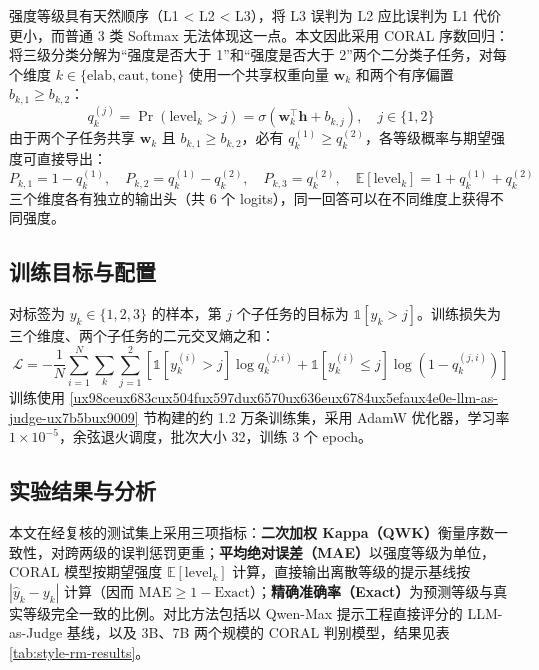 \documentclass[fontset=fandol,type=master,campus=shenzhen,etitleauto=true]{hithesisbook}
\begin{document}
强度等级具有天然顺序（L1 < L2 < L3），将 L3 误判为 L2 应比误判为 L1 代价更小，而普通 3 类 Softmax 无法体现这一点。本文因此采用 CORAL 序数回归\cite{ref86}：将三级分类分解为“强度是否大于 1”和“强度是否大于 2”两个二分类子任务，对每个维度 $k \in \{\text{elab}, \text{caut}, \text{tone}\}$ 使用一个共享权重向量 $\mathbf{w}_k$ 和两个有序偏置 $b_{k,1} \ge b_{k,2}$：
\begin{equation}
q_k^{(j)} = \Pr(\text{level}_k > j) = \sigma\!\left(\mathbf{w}_k^{\top}\mathbf{h} + b_{k,j}\right), \quad j \in \{1, 2\}
\end{equation}
由于两个子任务共享 $\mathbf{w}_k$ 且 $b_{k,1} \ge b_{k,2}$，必有 $q_k^{(1)} \ge q_k^{(2)}$，各等级概率与期望强度可直接导出：
\begin{equation}
P_{k,1} = 1 - q_k^{(1)}, \quad P_{k,2} = q_k^{(1)} - q_k^{(2)}, \quad P_{k,3} = q_k^{(2)}, \quad \mathbb{E}[\text{level}_k] = 1 + q_k^{(1)} + q_k^{(2)}
\end{equation}
三个维度各有独立的输出头（共 6 个 logits），同一回答可以在不同维度上获得不同强度。

\subsection{训练目标与配置}\label{ux8badux7ec3ux76eeux6807ux4e0eux4f18ux5316ux914dux7f6e-1}

对标签为 $y_k \in \{1,2,3\}$ 的样本，第 $j$ 个子任务的目标为 $\mathbb{1}[y_k > j]$。训练损失为三个维度、两个子任务的二元交叉熵之和：
\begin{equation}
\mathcal{L} = -\frac{1}{N}\sum_{i=1}^{N} \sum_{k} \sum_{j=1}^{2} \left[ \mathbb{1}[y_k^{(i)} > j] \log q_k^{(j,i)} + \mathbb{1}[y_k^{(i)} \le j] \log\!\left(1 - q_k^{(j,i)}\right) \right]
\end{equation}
训练使用 \ref{ux98ceux683cux504fux597dux6570ux636eux6784ux5efaux4e0e-llm-as-judge-ux7b5bux9009} 节构建的约 1.2 万条训练集，采用 AdamW 优化器，学习率 $1 \times 10^{-5}$，余弦退火调度，批次大小 32，训练 3 个 epoch。

\subsection{实验结果与分析}\label{ux98ceux683cux5224ux522bux5b9eux9a8cux7ed3ux679c}

本文在经复核的测试集上采用三项指标：\textbf{二次加权 Kappa（QWK）}衡量序数一致性，对跨两级的误判惩罚更重；\textbf{平均绝对误差（MAE）}以强度等级为单位，CORAL 模型按期望强度 $\mathbb{E}[\text{level}_k]$ 计算，直接输出离散等级的提示基线按 $|\hat{y}_k - y_k|$ 计算（因而 $\text{MAE} \ge 1 - \text{Exact}$）；\textbf{精确准确率（Exact）}为预测等级与真实等级完全一致的比例。对比方法包括以 Qwen-Max 提示工程直接评分的 LLM-as-Judge 基线，以及 3B、7B 两个规模的 CORAL 判别模型，结果见表 \ref{tab:style-rm-results}。
\end{document}
